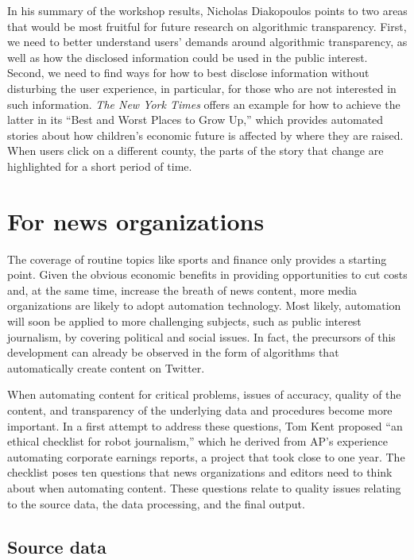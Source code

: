 \documentclass[notoc, symmetric, nobib, nols]{towcenter-book}
\begin{document}
In his summary of the workshop results, Nicholas Diakopoulos points to two areas that would be most fruitful for future research on algorithmic transparency.\cite{diak15} First, we need to better understand users’ demands around algorithmic transparency, as well as how the disclosed information could be used in the public interest. Second, we need to find ways for how to best disclose information without disturbing the user experience, in particular, for those who are not interested in such information. \textit{The New York Times} offers an example for how to achieve the latter in its ``Best and Worst Places to Grow Up,'' which provides automated stories about how children’s economic future is affected by where they are raised.\cite{leon15} When users click on a different county, the parts of the story that change are highlighted for a short period of time.

\section{For news organizations}

The coverage of routine topics like sports and finance only provides a starting point. Given the obvious economic benefits in providing opportunities to cut costs and, at the same time, increase the breath of news content, more media organizations are likely to adopt automation technology. Most likely, automation will soon be applied to more challenging subjects, such as public interest journalism, by covering political and social issues. In fact, the precursors of this development can already be observed in the form of algorithms that automatically create content on Twitter.\cite{lokot15} 

When automating content for critical problems, issues of accuracy, quality of the content, and transparency of the underlying data and procedures become more important. In a first attempt to address these questions, Tom Kent proposed ``an ethical checklist for robot journalism,'' which he derived from AP’s experience automating corporate earnings reports, a project that took close to one year. The checklist poses ten questions that news organizations and editors need to think about when automating content.\cite{kent15} These questions relate to quality issues relating to the source data, the data processing, and the final output.

\subsection{Source data}
\end{document}
